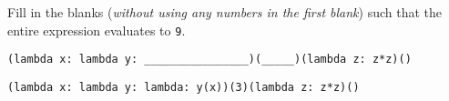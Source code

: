 \begin{blocksection}
\question Fill in the blanks (\emph{without using any numbers in the first blank}) such that the entire expression evaluates to \texttt{9}.

\ifprintanswers\else
\begin{lstlisting}
(lambda x: lambda y: ________________)(_____)(lambda z: z*z)()
\end{lstlisting}
\vspace{40 mm}
\fi

\begin{solution}[0in]
\begin{lstlisting}
(lambda x: lambda y: lambda: y(x))(3)(lambda z: z*z)()
\end{lstlisting}
\end{solution}
\end{blocksection}


